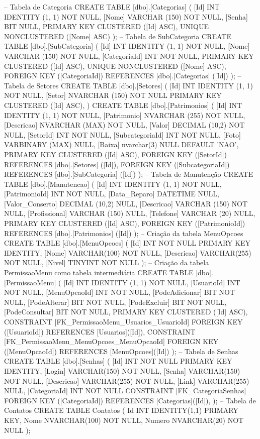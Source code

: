 -- Tabela de Categoria
CREATE TABLE [dbo].[Categorias] (
    [Id]   INT           IDENTITY (1, 1) NOT NULL,
    [Nome] VARCHAR (150) NOT NULL,
    [Senha] BIT NULL, 
    PRIMARY KEY CLUSTERED ([Id] ASC),
    UNIQUE NONCLUSTERED ([Nome] ASC)
);
-- Tabela de SubCategoria
CREATE TABLE [dbo].[SubCategoria] (
    [Id]           INT           IDENTITY (1, 1) NOT NULL,
    [Nome]         VARCHAR (150) NOT NULL,
    [CategoriaId] INT           NOT NULL,
    PRIMARY KEY CLUSTERED ([Id] ASC),
    UNIQUE NONCLUSTERED ([Nome] ASC),
    FOREIGN KEY ([CategoriaId]) REFERENCES [dbo].[Categorias] ([Id])
);
-- Tabela de Setores
CREATE TABLE [dbo].[Setores]
(
	[Id] INT  IDENTITY (1, 1) NOT NULL,
	[Setor]   NVARCHAR (150) NOT NULL
	PRIMARY KEY CLUSTERED ([Id] ASC),
)
CREATE TABLE [dbo].[Patrimonios] (
    [Id]             INT             IDENTITY (1, 1) NOT NULL,
    [Patrimonio]     NVARCHAR (255)  NOT NULL,
    [Descricao]      NVARCHAR (MAX)  NOT NULL,
    [Valor]          DECIMAL (10,2)    NOT NULL,
    [SetorId]        INT             NOT NULL,
    [SubcategoriaId] INT             NOT NULL,
    [Foto]           VARBINARY (MAX) NULL,
    [Baixa] nvarchar(3) NULL DEFAULT 'NAO', 
    PRIMARY KEY CLUSTERED ([Id] ASC),
    FOREIGN KEY ([SetorId]) REFERENCES [dbo].[Setores] ([Id]),
    FOREIGN KEY ([SubcategoriaId]) REFERENCES [dbo].[SubCategoria] ([Id])
);
-- Tabela de Manutenção
CREATE TABLE [dbo].[Manutencao] (
    [Id]             INT           IDENTITY (1, 1) NOT NULL,
    [PatrimonioId]   INT           NOT NULL,
    [Data_Reparo]    DATETIME      NULL,
    [Valor_Conserto] DECIMAL (10,2)  NULL,
    [Descricao]      VARCHAR (150) NOT NULL,
    [Profissional]   VARCHAR (150) NULL,
    [Telefone]       VARCHAR (20)  NULL,
    PRIMARY KEY CLUSTERED ([Id] ASC),
    FOREIGN KEY ([PatrimonioId]) REFERENCES [dbo].[Patrimonios] ([Id])
);
-- Criação da tabela MenuOpcoes
CREATE TABLE [dbo].[MenuOpcoes]
(
	[Id] INT NOT NULL PRIMARY KEY IDENTITY, 
    [Nome] VARCHAR(100) NOT NULL, 
    [Descricao] VARCHAR(255) NOT NULL, 
    [Nivel] TINYINT NOT NULL
);
-- Criação da tabela PermissaoMenu como tabela intermediária
CREATE TABLE [dbo].[PermissaoMenu] (
    [Id]             INT            IDENTITY (1, 1) NOT NULL,
    [UsuarioId]      INT            NOT NULL,
    [MenuOpcaoId]    INT            NOT NULL,
    [PodeAdicionar]  BIT            NOT NULL,
    [PodeAlterar]    BIT            NOT NULL,
    [PodeExcluir]    BIT            NOT NULL,
    [PodeConsultar]  BIT            NOT NULL,
    PRIMARY KEY CLUSTERED ([Id] ASC),
    CONSTRAINT [FK_PermissaoMenu_Usuarios_UsuarioId] FOREIGN KEY ([UsuarioId]) REFERENCES [Usuarios]([Id]),
    CONSTRAINT [FK_PermissaoMenu_MenuOpcoes_MenuOpcaoId] FOREIGN KEY ([MenuOpcaoId]) REFERENCES [MenuOpcoes]([Id])
);
-- Tabela de Senhas
CREATE TABLE [dbo].[Senhas]
(
	[Id] INT NOT NULL PRIMARY KEY IDENTITY, 
    [Login] VARCHAR(150) NOT NULL,
	[Senha] VARCHAR(150) NOT NULL, 
	[Descricao] VARCHAR(255) NOT NULL, 
	[Link] VARCHAR(255) NULL,
	[CategoriaId] INT NOT NULL 
	CONSTRAINT [FK_CategoriaSenhas] FOREIGN KEY ([CategoriaId]) REFERENCES [Categorias]([Id]),
);
-- Tabela de Contatos
CREATE TABLE Contatos (
    Id INT IDENTITY(1,1) PRIMARY KEY,
    Nome NVARCHAR(100) NOT NULL,
    Numero NVARCHAR(20) NOT NULL
);

